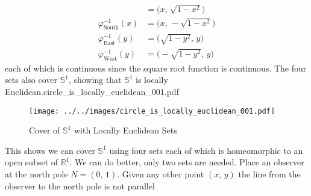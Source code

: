 \documentclass{article}
\theoremstyle{plain}
\theoremstyle{normal}
\newenvironment{example}{%
    \pushQED{\qed}\renewcommand{\qedsymbol}{$\blacksquare$}\examplex%
}{%
    \popQED\endexamplex%
}
\begin{document}
\begin{example}
\begin{align}
                &=\big(x,\,\sqrt{1-x^{2}}\big)\\
                \varphi_{\textrm{South}}^{-1}(x)
                &=\big(x,\,-\sqrt{1-x^{2}}\big)\\
                \varphi_{\textrm{East}}^{-1}(y)
                &=\big(\sqrt{1-y^{2}},\,y\big)\\
                \varphi_{\textrm{West}}^{-1}(y)
                &=\big(-\sqrt{1-y^{2}},\,y\big)
            \end{align}
            each of which is continuous since the square root function is
            continuous. The four sets also cover $\mathbb{S}^{1}$, showing that
            $\mathbb{S}^{1}$ is locally Euclidean.circle_is_locally_euclidean_001.pdf
        \end{example}
        \begin{figure}
            \centering
            \texttt{[image: ../../images/circle\_is\_locally\_euclidean\_001.pdf]}
            \caption{Cover of $\mathbb{S}^{1}$ with Locally Euclidean Sets}
            \label{fig:circle_is_locally_euclidean_001}
        \end{figure}
        This shows we can cover $\mathbb{S}^{1}$ using four sets each of which
        is homeomorphic to an open subset of $\mathbb{R}^{1}$. We can do better,
        only two sets are needed. Place an observer at the north pole
        $N=(0,\,1)$. Given any other point $(x,\,y)$ the line from the
        observer to the north pole is not parallel
\end{document}
